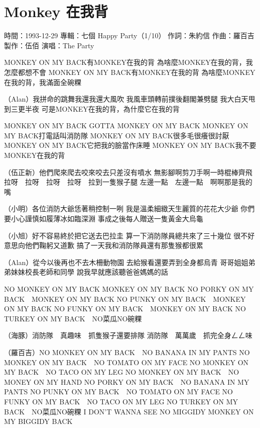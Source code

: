 \documentclass[UTF8,a4paper,oneside,twocolumn,12pt]{ctexbook}
\newcommand{\infopair}[2]{\textbullet #1：#2}
\newcommand{\zc}[1][伍佰]{\infopair{作詞}{#1}}
\newcommand{\zq}[1][伍佰]{\infopair{作曲}{#1}}
\newcommand{\zj}[1]{\infopair{專輯}{#1}}
\newcommand{\zz}[1]{\infopair{製作}{#1}}
\newcommand{\sj}[1]{\infopair{時間}{#1}}
\newenvironment{info}{\begin{flushleft}\kaishu
	}
	{\end{flushleft}\normalsize\yahei\par}
\newenvironment{lyric}{
	}
{}
\begin{document}
\section{Monkey 在我背}
\begin{info}
	\sj{1993-12-29}
	\zj{七個 Happy Party（1/10）}
	\zc[朱約信]
	\zq[羅百吉]
	\zz{伍佰}
	\infopair{演唱}{The Party}
\end{info}
\begin{lyric}
	MONKEY ON MY BACK有MONKEY在我的背
	為啥麼MONKEY在我的背，我怎麼都想不會
	MONKEY ON MY BACK有MONKEY在我的背
	為啥麼MONKEY在我的背，我滿面全碗粿

	（Alan）我拼命的跳舞我還我還大風吹
	我風車頭轉前撲後翻閣兼劈腿
	我大白天甩到三更半夜
	可是MONKEY在我的背，為什麼它在我的背

	MONKEY ON MY BACK GOTTA MONKEY ON MY BACK
	MONKEY ON MY BACK打電話叫消防隊
	MONKEY ON MY BACK很多毛很癢很討厭
	MONKEY ON MY BACK它把我的臉當作床睡
	MONKEY ON MY BACK我不要MONKEY在我的背

	（伍正新）他們爬來爬去咬來咬去只差沒有噴水
	無影腳啊剪刀手啊一時棍棒齊飛
	拉呀　拉呀　拉呀　拉呀　拉到一隻猴子腿
	左邊一點　左邊一點　啊啊那是我的嘴

	（小明）各位消防大爺恁著稍控制一咧
	我是溫柔細緻天生麗質的花花大少爺
	你們要小心謹慎如履薄冰如臨深淵
	事成之後每人贈送一隻黃金大烏龜

	（小旭）好不容易終於把它送去巴拉圭
	算一下消防隊員總共來了三十幾位
	很不好意思向他們鞠躬又道歉
	搞了一天我和消防隊員還有那隻猴都很累

	（Alan）從今以後再也不去木柵動物園
	去給猴看還要弄到全身都烏青
	哥哥姐姐弟弟妹妹校長老師和同學
	說我早就應該聽爸爸媽媽的話

	NO MONKEY ON MY BACK MONKEY ON MY BACK
	NO PORKY ON MY BACK　MONKEY ON MY BACK
	NO PUNKY ON MY BACK　MONKEY ON MY BACK
	NO FUNKY ON MY BACK　MONKEY ON MY BACK
	NO TURKEY ON MY BACK　NO菜瓜NO碗粿

	（海豚）消防隊　真趣味　抓隻猴子還要排隊
	消防隊　萬萬歲　抓完全身ㄥㄥ味

	（羅百吉）NO MONKEY ON MY BACK　NO BANANA IN MY PANTS
	NO MONKEY ON MY BACK　NO TOMATO ON MY FACE
	NO MONKEY ON MY BACK　NO TACO ON MY LEG
	NO MONKEY ON MY BACK　NO MONEY ON MY HAND
	NO PORKY ON MY BACK　NO BANANA IN MY PANTS
	NO PUNKY ON MY BACK　NO TOMATO ON MY FACE
	NO FUNKY ON MY BACK　NO TACO ON MY LEG
	NO TURKEY ON MY BACK　NO菜瓜NO碗粿
	I DON'T WANNA SEE NO MIGGIDY MONKEY ON MY BIGGIDY BACK
\end{lyric}
\end{document}
